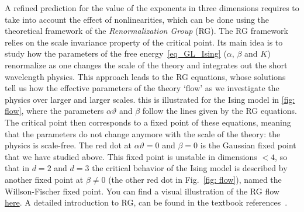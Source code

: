 A refined prediction for the value of the exponents in three dimensions requires to take into account the effect of nonlinearities, which can be done using the theoretical framework of the \emph{Renormalization Group} (RG).
The RG framework relies on the scale invariance property of the critical point.
Its main idea is to study how the parameters of the free energy~\eqref{eq_GL_Ising} ($\alpha$, $\beta$ and $K$) renormalize as one changes the scale of the theory and integrates out the short wavelength physics. 
This approach leads to the RG equations, whose solutions tell us how the effective parameters of the theory `flow' as we investigate the physics over larger and larger scales. 
this is illustrated for the Ising model in \autoref{fig: flow}, where the parameters $\alpha \vartheta$ and $\beta $ follow the lines given by the RG equations.
The critical point then corresponds to a fixed point of these equations, meaning that the parameters do not change anymore with the scale of the theory: the physics is scale-free.
The red dot at $\alpha\vartheta = 0$ and $\beta = 0$ is the Gaussian fixed point that we have studied above.
This fixed point is unstable in dimensions $< 4$, so that in $d = 2$ and $d = 3$ the critical behavior of the Ising model is described by another fixed point at $\beta \neq 0$ (the other red dot in Fig.~\ref{fig: flow}), named the Willson-Fischer fixed point.
You can find a visual illustration of the RG flow \href{https://www.youtube.com/watch?v=MxRddFrEnPc}{here}.
A detailed introduction to RG, can be found in the textbook references~\cite{Goldenfeld1992,Kardar2007}. 





